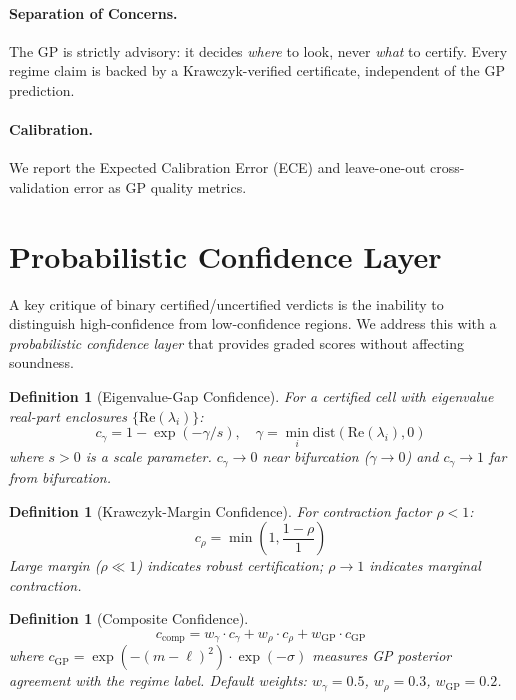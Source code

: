 \documentclass[11pt]{article}
\newtheorem{definition}[theorem]{Definition}
\begin{document}
\paragraph{Separation of Concerns.}
The GP is strictly advisory: it decides \emph{where} to look, never \emph{what} to certify.
Every regime claim is backed by a Krawczyk-verified certificate, independent of the GP prediction.

\paragraph{Calibration.}
We report the Expected Calibration Error (ECE) and leave-one-out cross-validation error as GP quality metrics.

\section{Probabilistic Confidence Layer}
\label{sec:confidence}

A key critique of binary certified/uncertified verdicts is the inability to distinguish high-confidence from low-confidence regions.
We address this with a \emph{probabilistic confidence layer} that provides graded scores without affecting soundness.

\begin{definition}[Eigenvalue-Gap Confidence]
For a certified cell with eigenvalue real-part enclosures $\{\mathrm{Re}(\lambda_i)\}$:
\[
c_\gamma = 1 - \exp(-\gamma / s), \quad \gamma = \min_i \mathrm{dist}(\mathrm{Re}(\lambda_i), 0)
\]
where $s > 0$ is a scale parameter.
$c_\gamma \to 0$ near bifurcation ($\gamma \to 0$) and $c_\gamma \to 1$ far from bifurcation.
\end{definition}

\begin{definition}[Krawczyk-Margin Confidence]
For contraction factor $\rho < 1$:
\[
c_\rho = \min\!\left(1, \frac{1 - \rho}{1}\right)
\]
Large margin ($\rho \ll 1$) indicates robust certification; $\rho \to 1$ indicates marginal contraction.
\end{definition}

\begin{definition}[Composite Confidence]
\[
c_{\mathrm{comp}} = w_\gamma \cdot c_\gamma + w_\rho \cdot c_\rho + w_{\mathrm{GP}} \cdot c_{\mathrm{GP}}
\]
where $c_{\mathrm{GP}} = \exp(-(m - \ell)^2) \cdot \exp(-\sigma)$ measures GP posterior agreement with the regime label.
Default weights: $w_\gamma = 0.5$, $w_\rho = 0.3$, $w_{\mathrm{GP}} = 0.2$.
\end{definition}
\end{document}
